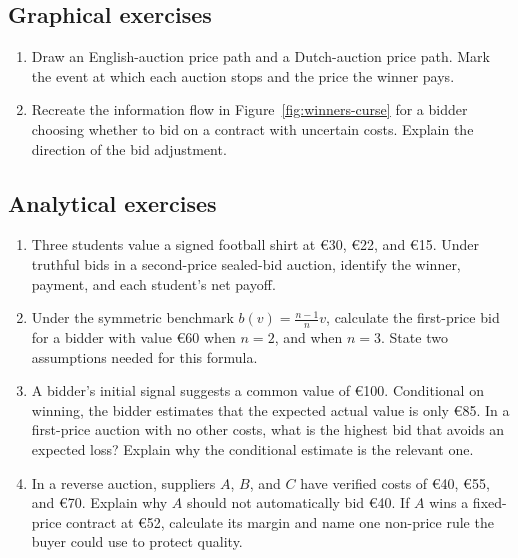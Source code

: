 \subsection*{Graphical exercises}
\begin{enumerate}[resume,label=\arabic*.]
  \item Draw an English-auction price path and a Dutch-auction price path. Mark the event at which each auction stops and the price the winner pays.
  \item Recreate the information flow in Figure~\ref{fig:winners-curse} for a bidder choosing whether to bid on a contract with uncertain costs. Explain the direction of the bid adjustment.
\end{enumerate}

\subsection*{Analytical exercises}
\begin{enumerate}[resume,label=\arabic*.]
  \item Three students value a signed football shirt at \euro30, \euro22, and \euro15. Under truthful bids in a second-price sealed-bid auction, identify the winner, payment, and each student's net payoff.
  \item Under the symmetric benchmark \(b(v)=\frac{n-1}{n}v\), calculate the first-price bid for a bidder with value \euro60 when \(n=2\), and when \(n=3\). State two assumptions needed for this formula.
  \item A bidder's initial signal suggests a common value of \euro100. Conditional on winning, the bidder estimates that the expected actual value is only \euro85. In a first-price auction with no other costs, what is the highest bid that avoids an expected loss? Explain why the conditional estimate is the relevant one.
  \item In a reverse auction, suppliers \(A\), \(B\), and \(C\) have verified costs of \euro40, \euro55, and \euro70. Explain why \(A\) should not automatically bid \euro40. If \(A\) wins a fixed-price contract at \euro52, calculate its margin and name one non-price rule the buyer could use to protect quality.
\end{enumerate}

